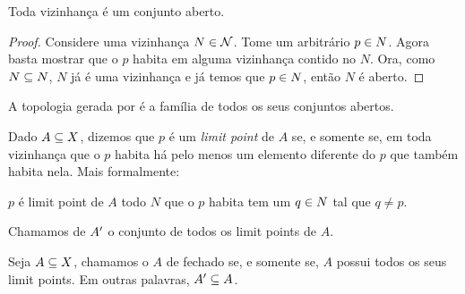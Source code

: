 \begin{fact}
	Toda vizinhança é um conjunto aberto.
\end{fact}

\begin{proof}
	Considere uma vizinhança $N \in \mathcal{N}$. Tome um arbitrário $p \in N$. Agora basta mostrar que o $p$ habita em alguma vizinhança contido no $N$. Ora, como $N \subseteq N$, $N$ já é uma vizinhança e já temos que $p \in N$, então $N$ é aberto.
\end{proof}

\begin{definition}
	A topologia gerada por  é a família  de todos os seus conjuntos abertos.
\end{definition}

\begin{definition}
	Dado $A \subseteq X$, dizemos que $p$ é um \textit{limit point} de $A$ se, e somente se, em toda vizinhança que o $p$ habita há pelo menos um elemento diferente do $p$ que também habita nela. Mais formalmente:
	\begin{center}
		$p$ é limit point de $A$ \sse todo $N$ que o $p$ habita tem um $q \in N$ tal que $q \neq p$. 
	\end{center}
\end{definition}

\begin{definition}
	Chamamos de $A^\prime$ o conjunto de todos os limit points de $A$.
\end{definition}

\begin{definition}
	Seja $A \subseteq X$, chamamos o $A$ de fechado se, e somente se, $A$ possui todos os seus limit points. Em outras palavras, $A^\prime \subseteq A$.
\end{definition}